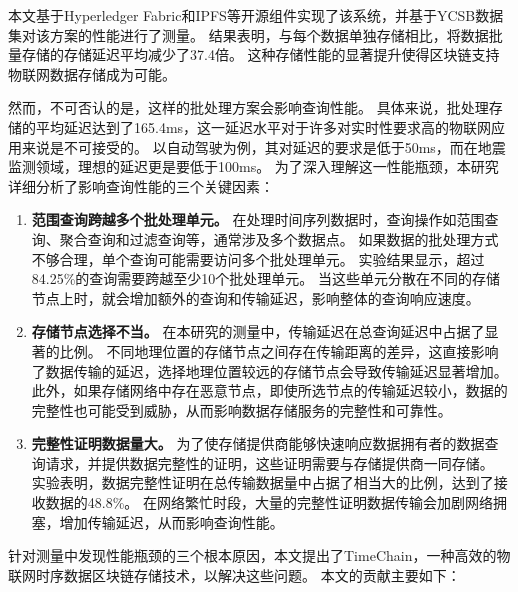 本文基于Hyperledger Fabric和IPFS等开源组件实现了该系统，并基于YCSB数据集对该方案的性能进行了测量。
结果表明，与每个数据单独存储相比，将数据批量存储的存储延迟平均减少了37.4倍。
这种存储性能的显著提升使得区块链支持物联网数据存储成为可能。

然而，不可否认的是，这样的批处理方案会影响查询性能。
具体来说，批处理存储的平均延迟达到了165.4ms，这一延迟水平对于许多对实时性要求高的物联网应用来说是不可接受的。
以自动驾驶为例，其对延迟的要求是低于50ms，而在地震监测领域，理想的延迟更是要低于100ms。
为了深入理解这一性能瓶颈，本研究详细分析了影响查询性能的三个关键因素：

\begin{enumerate}
    \item \textbf{范围查询跨越多个批处理单元。}
    在处理时间序列数据时，查询操作如范围查询、聚合查询和过滤查询等，通常涉及多个数据点。
    如果数据的批处理方式不够合理，单个查询可能需要访问多个批处理单元。
    实验结果显示，超过84.25\%的查询需要跨越至少10个批处理单元。
    当这些单元分散在不同的存储节点上时，就会增加额外的查询和传输延迟，影响整体的查询响应速度。
    
    \item \textbf{存储节点选择不当。}
    在本研究的测量中，传输延迟在总查询延迟中占据了显著的比例。
    不同地理位置的存储节点之间存在传输距离的差异，这直接影响了数据传输的延迟，选择地理位置较远的存储节点会导致传输延迟显著增加。
    此外，如果存储网络中存在恶意节点，即使所选节点的传输延迟较小，数据的完整性也可能受到威胁，从而影响数据存储服务的完整性和可靠性。

    \item \textbf{完整性证明数据量大。}
    为了使存储提供商能够快速响应数据拥有者的数据查询请求，并提供数据完整性的证明，这些证明需要与存储提供商一同存储。
    实验表明，数据完整性证明在总传输数据量中占据了相当大的比例，达到了接收数据的48.8\%。
    在网络繁忙时段，大量的完整性证明数据传输会加剧网络拥塞，增加传输延迟，从而影响查询性能。
\end{enumerate}

针对测量中发现性能瓶颈的三个根本原因，本文提出了TimeChain，一种高效的物联网时序数据区块链存储技术，以解决这些问题。
本文的贡献主要如下：

